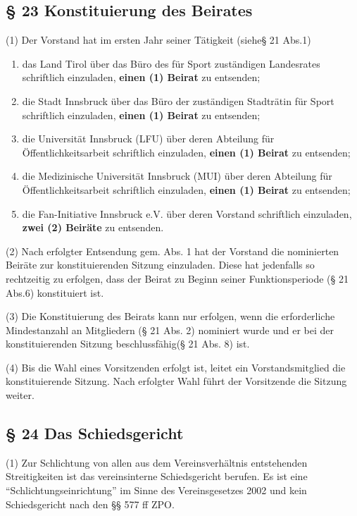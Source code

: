\documentclass[11pt,a4paper]{article}
\begin{document}
\subsection{§ 23
Konstituierung des Beirates}

(1)
Der Vorstand hat im ersten Jahr seiner Tätigkeit (siehe§ 21 Abs.1)

\begin{enumerate}[label=\alph*)]
\item
das Land Tirol über das Büro des für Sport zuständigen Landesrates schriftlich einzuladen, \textbf{einen (1) Beirat} zu entsenden;
\item
die Stadt Innsbruck über das Büro der zuständigen Stadträtin für Sport schriftlich einzuladen, \textbf{einen (1) Beirat} zu entsenden;
\item
die Universität Innsbruck (LFU) über deren Abteilung für Öffentlichkeitsarbeit schriftlich einzuladen, \textbf{einen (1) Beirat} zu entsenden;
\item
die Medizinische Universität Innsbruck (MUI) über deren Abteilung für Öffentlichkeitsarbeit schriftlich einzuladen, \textbf{einen (1) Beirat} zu entsenden;
\item
die Fan-Initiative Innsbruck e.V. über deren Vorstand schriftlich einzuladen, \textbf{zwei (2) Beiräte} zu entsenden.
\end{enumerate}

(2)
Nach erfolgter Entsendung gem. Abs. 1 hat der Vorstand die nominierten Beiräte zur konstituierenden Sitzung einzuladen.
Diese hat jedenfalls so rechtzeitig zu erfolgen, dass der Beirat zu Beginn seiner Funktionsperiode (§ 21 Abs.6) konstituiert ist.

(3)
Die Konstituierung des Beirats kann nur erfolgen, wenn die erforderliche Mindestanzahl an Mitgliedern (§ 21 Abs. 2) nominiert wurde und er bei der konstituierenden Sitzung beschlussfähig(§ 21 Abs. 8) ist.

(4)
Bis die Wahl eines Vorsitzenden erfolgt ist, leitet ein Vorstandsmitglied die konstituierende Sitzung.
Nach erfolgter Wahl führt der Vorsitzende die Sitzung weiter.

\subsection{§ 24
Das Schiedsgericht}

(1)
Zur Schlichtung von allen aus dem Vereinsverhältnis entstehenden Streitigkeiten ist das vereinsinterne Schiedsgericht berufen.
Es ist eine "`Schlichtungseinrichtung"' im Sinne des Vereinsgesetzes 2002 und kein Schiedsgericht nach den §§ 577 ff ZPO.
\end{document}
